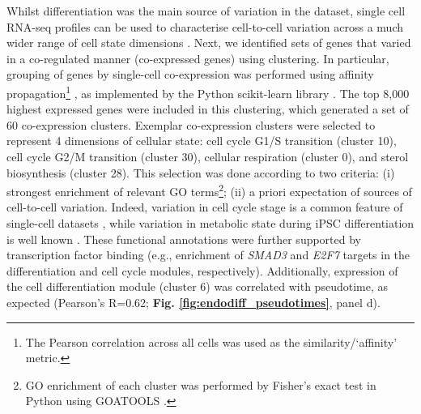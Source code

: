 Whilst differentiation was the main source of variation in the dataset, single cell RNA-seq profiles can be used to characterise cell-to-cell variation across a much wider range of cell state dimensions \cite{buettner2015computational, buettner2017f, fan2016characterizing}. 
Next, we identified sets of genes that varied in a co-regulated manner (co-expressed genes) using clustering.
In particular, grouping of genes by single-cell co-expression was performed using affinity propagation\footnote{The Pearson correlation across all cells was used as the similarity/‘affinity’ metric.} \cite{frey2007clustering}, as implemented by the Python scikit-learn library \cite{garreta2013learning}. 
The top 8,000 highest expressed genes were included in this clustering,
which generated a set of 60 co-expression clusters. 
Exemplar co-expression clusters were selected to represent 4 dimensions of
cellular state: cell cycle G1/S transition (cluster
10), cell cycle G2/M transition (cluster 30), cellular respiration (cluster 0), and
sterol biosynthesis (cluster 28). 
This selection was done according to two criteria: (i) strongest enrichment of relevant GO terms\footnote{GO enrichment of each cluster was performed by Fisher’s exact test in Python using GOATOOLS \cite{klopfenstein2018goatools}.};
(ii) a priori expectation of sources of cell-to-cell variation. 
Indeed, variation in cell cycle stage is a common feature of single-cell datasets \cite{buettner2015computational}, while variation in metabolic state during iPSC differentiation is well known \cite{xu2013mitochondrial}.
These functional annotations were further supported by transcription factor binding (e.g., enrichment of \textit{SMAD3} and \textit{E2F7} targets in the differentiation and cell cycle modules, respectively). 
Additionally, expression of the cell differentiation module (cluster 6) was correlated with pseudotime, as expected (Pearson's R=0.62; \textbf{Fig. \ref{fig:endodiff_pseudotimes}}, panel d).\\


